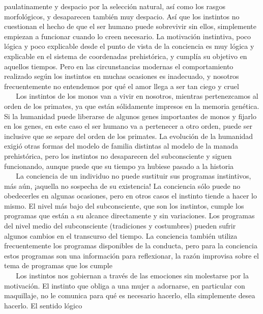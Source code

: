 paulatinamente y despacio por la selección natural, así como los rasgos
morfológicos, y desaparecen también muy despacio. Así que los instintos
no cuestionan el hecho de que el ser humano puede sobrevivir sin ellos,
simplemente empiezan a funcionar cuando lo creen necesario. La
motivación instintiva, poco lógica y poco explicable desde el punto de
vista de la conciencia es muy lógica y explicable en el sistema de
coordenadas prehistórica, y cumplía su objetivo en aquellos tiempos.
Pero en las circunstancias modernas el comportamiento realizado según
los instintos en muchas ocasiones es inadecuado, y nosotros
frecuentemente no entendemos por qué el amor llega a ser tan ciego y
cruel\\
\hspace*{0.333em} ~ ~ Los instintos de los monos van a vivir en
nosotros, mientras pertenezcamos al orden de los primates, ya que están
sólidamente impresos en la memoria genética. Si la humanidad puede
liberarse de algunos genes importantes de monos y fijarlo en los genes,
en este caso el ser humano va a pertenecer a otro orden, puede ser
inclusive que se separe del orden de los primates. La evolución de la
humanidad exigió otras formas del modelo de familia distintas al modelo
de la manada prehistórica, pero los instintos no desaparecen del
subconsciente y siguen funcionando, aunque puede que su tiempo ya
hubiese pasado a la historia\\
\hspace*{0.333em} ~ ~ La conciencia de un individuo no puede sustituir
sus programas instintivos, más aún, ¡aquella no sospecha de su
existencia! La conciencia sólo puede no obedecerles en algunas
ocasiones, pero en otros casos el instinto tiende a hacer lo mismo. El
nivel más bajo del subconsciente, que son los instintos, cumple los
programas que están a su alcance directamente y sin variaciones. Los
programas del nivel medio del subconsciente (tradiciones y costumbres)
pueden sufrir algunos cambios en el transcurso del tiempo. La conciencia
también utiliza frecuentemente los programas disponibles de la conducta,
pero para la conciencia estos programas son una información para
reflexionar, la razón improvisa sobre el tema de programas que los
cumple\\
\hspace*{0.333em} ~ ~ Los instintos nos gobiernan a través de las
emociones sin molestarse por la motivación. El instinto que obliga a una
mujer a adornarse, en particular con maquillaje, no le comunica para qué
es necesario hacerlo, ella simplemente desea hacerlo. El sentido lógico
